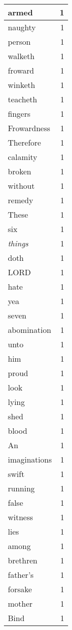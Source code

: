 \begin{center}
\begin{longtable}{l|r}
armed & 1\\ \hline 
naughty & 1\\ \hline 
person & 1\\ \hline 
walketh & 1\\ \hline 
froward & 1\\ \hline 
winketh & 1\\ \hline 
teacheth & 1\\ \hline 
fingers & 1\\ \hline 
Frowardness & 1\\ \hline 
Therefore & 1\\ \hline 
calamity & 1\\ \hline 
broken & 1\\ \hline 
without & 1\\ \hline 
remedy & 1\\ \hline 
These & 1\\ \hline 
six & 1\\ \hline 
\emph{things} & 1\\ \hline 
doth & 1\\ \hline 
LORD & 1\\ \hline 
hate & 1\\ \hline 
yea & 1\\ \hline 
seven & 1\\ \hline 
abomination & 1\\ \hline 
unto & 1\\ \hline 
him & 1\\ \hline 
proud & 1\\ \hline 
look & 1\\ \hline 
lying & 1\\ \hline 
shed & 1\\ \hline 
blood & 1\\ \hline 
An & 1\\ \hline 
imaginations & 1\\ \hline 
swift & 1\\ \hline 
running & 1\\ \hline 
false & 1\\ \hline 
witness & 1\\ \hline 
lies & 1\\ \hline 
among & 1\\ \hline 
brethren & 1\\ \hline 
father's & 1\\ \hline 
forsake & 1\\ \hline 
mother & 1\\ \hline 
Bind & 1\\ \hline 

\end{longtable}
\end{center}
